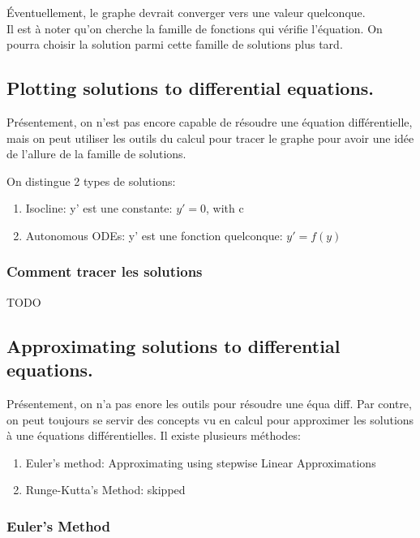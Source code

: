 \documentclass{article}
\begin{document}
Éventuellement, le graphe devrait converger vers une valeur quelconque.\\

Il est à noter qu'on cherche la famille de fonctions qui vérifie l'équation.
 On pourra choisir la solution parmi cette famille de solutions plus tard.

\subsection{Plotting solutions to differential equations. }

Présentement, on n'est pas encore capable de résoudre une équation
différentielle, mais on peut utiliser les outils du calcul pour tracer
le graphe pour avoir une idée de l'allure de la famille de solutions.

On distingue 2 types de solutions:
\begin{enumerate}
    \item Isocline: y' est une constante: $ y' = 0$, with c
    \item Autonomous ODEs: y' est une fonction quelconque: $ y' = f(y)$
\end{enumerate}

\subsubsection{Comment tracer les solutions}

TODO

\subsection{Approximating solutions to differential equations. }

Présentement, on n'a pas enore les outils pour résoudre une équa diff.
Par contre, on peut toujours se servir des concepts vu en calcul pour
approximer les solutions à une équations différentielles. Il existe
plusieurs méthodes:
\begin{enumerate}
    \item Euler's method: Approximating using stepwise Linear Approximations
    \item Runge-Kutta's Method: skipped
\end{enumerate}

\subsubsection{Euler's Method}
\end{document}
